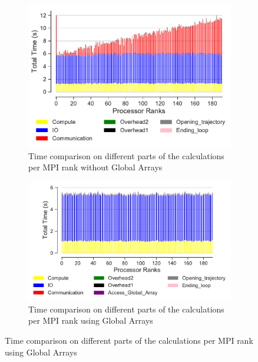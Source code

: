 \begin{figure}[ht!]
\begin{subfigure} {.45\textwidth}
  \includegraphics[width=\linewidth]{figures/split-BarPlot-rank-comparison_192_5.pdf}
  \captionsetup{format=hang}
   \caption{Time comparison on different parts of the calculations per MPI rank without Global Arrays}
  \label{fig:MPIranks-split}
\end{subfigure}
\hfill
\begin{subfigure} {.5\textwidth}
  \includegraphics[width=\linewidth]{figures/split-ga-BarPlot-rank-comparison_192_5.pdf}
  \captionsetup{format=hang}
  \caption{Time comparison on different parts of the calculations per MPI rank using Global Arrays}
  \label{fig:MPIranks-split-ga}
\end{subfigure}


\end{figure}
